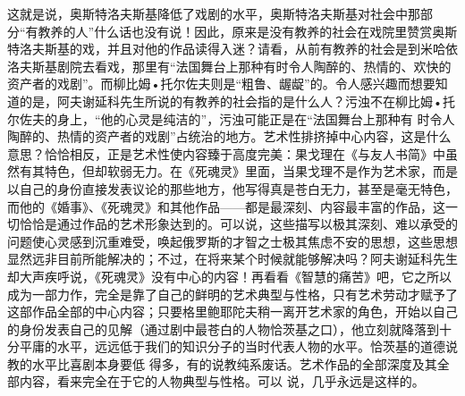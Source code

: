 \documentclass{article}
\begin{document}
这就是说，奥斯特洛夫斯基降低了戏剧的水平，奥斯特洛夫斯基对社会中那部分“有教养的人”什么话也没有说！因此，原来是没有教养的社会在戏院里赞赏奥斯特洛夫斯基的戏，并且对他的作品读得入迷？请看，从前有教养的社会是到米哈依洛夫斯基剧院去看戏，那里有“法国舞台上那种有时令人陶醉的、热情的、欢快的资产者的戏剧”。而柳比姆•托尔佐夫则是“粗鲁、龌龊”的。令人感兴趣而想要知道的是，阿夫谢延科先生所说的有教养的社会指的是什么人？污浊不在柳比姆•托尔佐夫的身上，“他的心灵是纯洁的”，污浊可能正是在“法国舞台上那种有
\newpage
时令人陶醉的、热情的资产者的戏剧”占统治的地方。艺术性排挤掉中心内容，这是什么意思？恰恰相反，正是艺术性使内容臻于高度完美：果戈理在《与友人书简》中虽然有其特色，但却软弱无力。在《死魂灵》里面，当果戈理不是作为艺术家，而是以自己的身份直接发表议论的那些地方，他写得真是苍白无力，甚至是毫无特色，而他的《婚事》、《死魂灵》和其他作品——都是最深刻、内容最丰富的作品，这一切恰恰是通过作品的艺术形象达到的。可以说，这些描写以极其深刻、难以承受的问题使心灵感到沉重难受，唤起俄罗斯的才智之士极其焦虑不安的思想，这些思想显然远非目前所能解决的；不过，在将来某个时候就能够解决吗？阿夫谢延科先生却大声疾呼说，《死魂灵》没有中心的内容！再看看《智慧的痛苦》吧，它之所以成为一部力作，完全是靠了自己的鲜明的艺术典型与性格，只有艺术劳动才赋予了这部作品全部的中心内容；只要格里鲍耶陀夫稍一离开艺术家的角色，开始以自己的身份发表自己的见解（通过剧中最苍白的人物恰茨基之口），他立刻就降落到十分平庸的水平，远远低于我们的知识分子的当时代表人物的水平。恰茨基的道德说教的水平比喜剧本身要低
\newpage
得多，有的说教纯系废话。艺术作品的全部深度及其全部内容，看来完全在于它的人物典型与性格。可以
说，几乎永远是这样的。 
\end{document}
